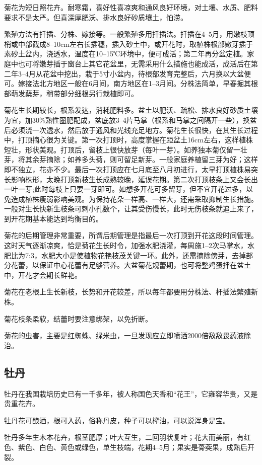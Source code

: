 \documentclass{ctexbook}
\begin{document}
菊花为短日照花卉。耐寒霜，喜好性喜凉爽和通风良好环境，对土壤、水质、肥料要求不是太严。但喜深厚肥沃、排水良好砂质壤土，怕涝。

繁殖方法有扦插、分株、嫁接等。一般繁殖多用扦插法。扦插在4--5月，用嫩枝顶梢或中部截成8--10cm左右长插穗，插入砂土中，或开花时，取植株根部嫩芽插于素砂土盆内，浇透水，温度在10--15℃环境中，便可成活；第二年再分盆定植。家庭中也可将嫩芽插于窗台上其它花盆里，无需采用什么措施也能成活，成活后在第二年3--4月从花盆中挖出，栽于5寸小盆内，待根部发育完整后，六月换以大盆便可。嫁接法北方地区一般在6月间，南方地区在1--3月间。分株法简单，早春掘其根部萌发蘖芽，稍带部分细根另行栽植即可。

菊花生长期较长，根系发达，消耗肥料多。盆土以肥沃、疏松、排水良好砂质土壤为宜，加30\%熟性圈肥配成，盆底放3--4片马掌（根系和马掌之间隔开一些），换盆后必须浇一次透水，然后放于通风和光线充足地方。菊花生长很快，在其生长过程中，打顶摘心很为关键。第一次打顶时，高度掌握在距盆土16cm左右，这样植株短壮，形状美观。打顶后，留枝上很快放芽（每叶一芽）。如养独本菊仅留一壮芽，将其余芽摘除；如养多头菊，则可留足新芽。一般家庭养植留三芽为好；这样即不独立，花亦不少。最后一次打顶应在七月底至八月初进行，太早打顶植株易突长影响株形，太晚打顶新枝生长成熟较晚，延误花期。第二次打顶枝条上又会长出一叶一芽;此时每枝上只要一芽即可。如想多开花可多留芽，但不宜开花过多，以免造成植株瘦弱影响美观。为保持花朵一样高、一样大，还需采取抑制生长措施。一般对生长快新生枝条可剌小孔数个，让其受伤慢长，此时无伤枝条就追上来了，到开花期基本能达到均衡目的。

菊花的后期管理非常重要，所谓后期管理是指最后一次打顶到开花这段时间管理。这时天气逐渐凉爽，恰是菊花生长时令，加强水肥浇灌，每周施1--2次马掌水，水肥比为7:3，水肥大小是使植物花艳枝茂关键一环。此外，还需摘除傍芽，去掉部分花蕾，以保证中心花蕾有足够营养。大盆菊花规蕾期，也可将整鸡蛋拌在盆土中，开花才会期长鲜艳。

菊花在老根上生长新枝，长势和开花较差，所以每年都要用分株法、杆插法繁殖新株。

菊花枝条柔软，结蕾时要注意绑架，以免折断。

菊花的虫害，主要是红蜘蛛、绿米虫，一旦发现应立即喷洒2000倍敌敌畏药液除治。
\subsection{牡丹}
牡丹在我国栽培历史已有一千多年，被人称国色天香和“花王”，它雍容华贵，又是贵重花卉。

牡丹花可酿酒，根可入药，俗称丹皮，种子可以榨油，可以说浑身是宝。

牡丹多年生木本花卉，根茎肥厚；叶大互生，二回羽状复叶；花大而美丽，有红色、紫色、白色、黄色或绿色，单生枝端，花期4--5月；果实是蓇葖果，成熟后开裂。
\end{document}

